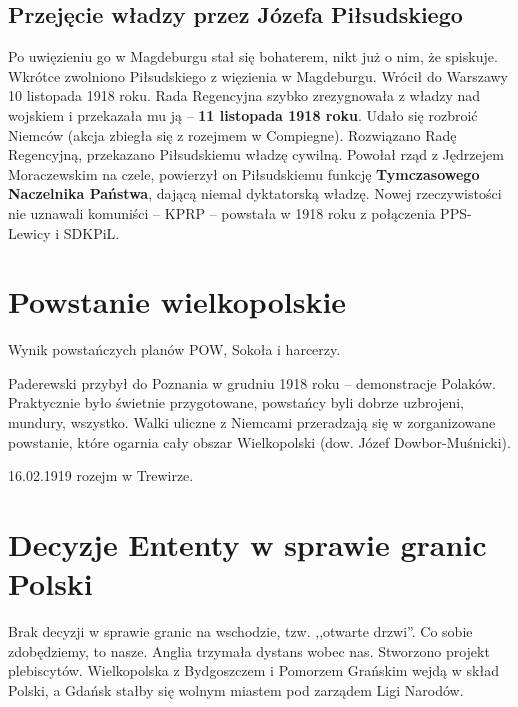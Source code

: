\documentclass [a4paper, 11pt, oneside]{book}
\begin{document}
        \subsection{Przejęcie władzy przez Józefa Piłsudskiego} %
        \label{sub:przej_cie_w_adzy_przez_j_zefa_pi_sudskiego}
            Po uwięzieniu go w Magdeburgu stał się bohaterem, nikt już o nim, że spiskuje. Wkrótce zwolniono Piłsudskiego z więzienia w Magdeburgu. Wrócił do Warszawy 10 listopada 1918 roku. Rada Regencyjna szybko zrezygnowała z władzy nad wojskiem i przekazała mu ją -- \textbf{11 listopada 1918 roku}. Udało się rozbroić Niemców (akcja zbiegła się z rozejmem w Compiegne). Rozwiązano Radę Regencyjną, przekazano Piłsudskiemu władzę cywilną. Powołał rząd z Jędrzejem Moraczewskim na czele, powierzył on Piłsudskiemu funkcję \textbf{Tymczasowego Naczelnika Państwa}, dającą niemal dyktatorską władzę. Nowej rzeczywistości nie uznawali komuniści -- KPRP -- powstała w 1918 roku z połączenia PPS-Lewicy i SDKPiL.
    \section{Powstanie wielkopolskie} %
    \label{sec:powstanie_wielkopolskie}
        Wynik powstańczych planów POW, Sokoła i harcerzy.

        Paderewski przybył do Poznania w grudniu 1918 roku -- demonstracje Polaków. Praktycznie było świetnie przygotowane, powstańcy byli dobrze uzbrojeni, mundury, wszystko. Walki uliczne z Niemcami przeradzają się w zorganizowane powstanie, które ogarnia cały obszar Wielkopolski (dow. Józef Dowbor-Muśnicki).

        16.02.1919 rozejm w Trewirze.
    \section{Decyzje Ententy w sprawie granic Polski} %
    \label{sec:decyzje_ententy_w_sprawie_granic_polski}
        Brak decyzji w sprawie granic na wschodzie, tzw. ,,otwarte drzwi''. Co sobie zdobędziemy, to nasze. Anglia trzymała dystans wobec nas. Stworzono projekt plebiscytów. Wielkopolska z Bydgoszczem i Pomorzem Grańskim wejdą w skład Polski, a Gdańsk stałby się wolnym miastem pod zarządem Ligi Narodów.
\end{document}
